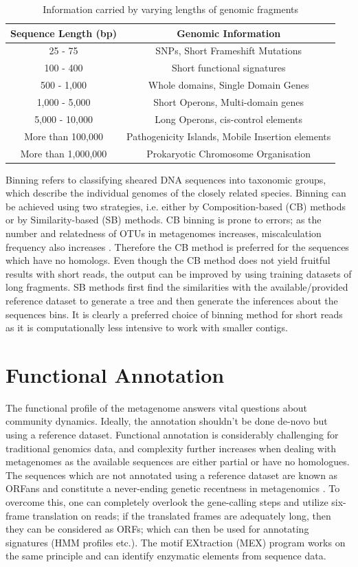 \begin{table}[ht]
\centering
\caption{Information carried by varying lengths of genomic fragments}
 \begin{tabular}{|c | c|} 
 \hline
 Sequence Length (bp) & Genomic Information \\ [0.5ex] 
 \hline\hline
 25 - 75 & SNPs, Short Frameshift Mutations \\ 
 \hline
 100 - 400 & Short functional signatures \\
 \hline
 500 - 1,000 & Whole domains, Single Domain Genes \\
 \hline
 1,000 - 5,000 & Short Operons, Multi-domain genes \\
 \hline
 5,000 - 10,000 & Long Operons, cis-control elements \\
 \hline
 More than 100,000 & Pathogenicity Islands, Mobile Insertion elements \\
 \hline
 More than 1,000,000 & Prokaryotic Chromosome Organisation \\
 \hline
\end{tabular}
\label{table1}
\end{table}

Binning refers to classifying sheared DNA sequences into taxonomic groups, which describe the individual genomes of the closely related species. Binning can be achieved using two strategies, i.e. either by Composition-based (CB) methods or by Similarity-based (SB) methods. CB binning is prone to errors; as the number and relatedness of OTUs in metagenomes increases, miscalculation frequency also increases \cite{ref11}. Therefore the CB method is preferred for the sequences which have no homologs. Even though the CB method does not yield fruitful results with short reads, the output can be improved by using training datasets of long fragments. SB methods first find the similarities with the available/provided reference dataset to generate a tree and then generate the inferences about the sequences bins. It is clearly a preferred choice of binning method for short reads as it is computationally less intensive to work with smaller contigs.

\section{Functional Annotation}
The functional profile of the metagenome answers vital questions about community dynamics. Ideally, the annotation shouldn't be done de-novo but using a reference dataset. Functional annotation is considerably challenging for traditional genomics data, and complexity further increases when dealing with metagenomes as the available sequences are either partial or have no homologues. The sequences which are not annotated using a reference dataset are known as ORFans and constitute a never-ending genetic recentness in metagenomics \cite{ref12}. To overcome this, one can completely overlook the gene-calling steps and utilize six-frame translation on reads; if the translated frames are adequately long, then they can be considered as ORFs; which can then be used for annotating signatures (HMM profiles etc.). The motif EXtraction (MEX) program works on the same principle and can identify enzymatic elements from sequence data.